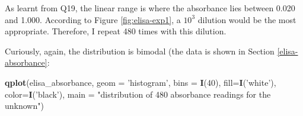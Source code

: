 \documentclass[
]{article}
\newenvironment{Shaded}{\begin{snugshade}}{\end{snugshade}}
\newcommand{\CommentTok}[1]{\textcolor[rgb]{0.56,0.35,0.01}{\textit{#1}}}
\newcommand{\DataTypeTok}[1]{\textcolor[rgb]{0.13,0.29,0.53}{#1}}
\newcommand{\DecValTok}[1]{\textcolor[rgb]{0.00,0.00,0.81}{#1}}
\newcommand{\KeywordTok}[1]{\textcolor[rgb]{0.13,0.29,0.53}{\textbf{#1}}}
\newcommand{\NormalTok}[1]{#1}
\newcommand{\OperatorTok}[1]{\textcolor[rgb]{0.81,0.36,0.00}{\textbf{#1}}}
\newcommand{\StringTok}[1]{\textcolor[rgb]{0.31,0.60,0.02}{#1}}
\begin{document}
\begin{Shaded}
\end{Shaded}

As learnt from Q19, the linear range is where the absorbance lies between 0.020 and 1.000. According to Figure \ref{fig:elisa-exp1}, a \(10^3\) dilution would be the most appropriate. Therefore, I repeat 480 times with this dilution.

\begin{Shaded}
\end{Shaded}

Curiously, again, the distribution is bimodal (the data is shown in Section \ref{elisa-absorbance}:

\begin{Shaded}
\begin{Highlighting}[]
\KeywordTok{qplot}\NormalTok{(elisa_absorbance, }\DataTypeTok{geom =} \StringTok{'histogram'}\NormalTok{, }\DataTypeTok{bins =} \KeywordTok{I}\NormalTok{(}\DecValTok{40}\NormalTok{), }\DataTypeTok{fill=}\KeywordTok{I}\NormalTok{(}\StringTok{'white'}\NormalTok{), }\DataTypeTok{color=}\KeywordTok{I}\NormalTok{(}\StringTok{'black'}\NormalTok{),}
      \DataTypeTok{main =} \StringTok{"distribution of 480 absorbance readings for the unknown"}\NormalTok{)}
\end{Highlighting}
\end{Shaded}
\end{document}
